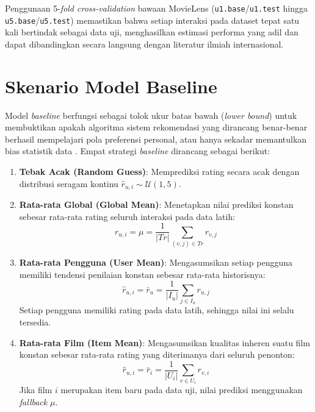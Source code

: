 Penggunaan 5-\textit{fold cross-validation} bawaan MovieLens (\texttt{u1.base}/\texttt{u1.test} hingga \texttt{u5.base}/\texttt{u5.test}) memastikan bahwa setiap interaksi pada dataset tepat satu kali bertindak sebagai data uji, menghasilkan estimasi performa yang adil dan dapat dibandingkan secara langsung dengan literatur ilmiah internasional.

\section{Skenario Model Baseline}
Model \textit{baseline} berfungsi sebagai tolok ukur batas bawah (\textit{lower bound}) untuk membuktikan apakah algoritma sistem rekomendasi yang dirancang benar-benar berhasil mempelajari pola preferensi personal, atau hanya sekadar memantulkan bias statistik data \citep{jannach2010recommender}. Empat strategi \textit{baseline} dirancang sebagai berikut:
\begin{enumerate}
    \item \textbf{Tebak Acak (Random Guess)}: Memprediksi rating secara acak dengan distribusi seragam kontinu $\hat{r}_{u,i} \sim \mathcal{U}(1, 5)$.
    \item \textbf{Rata-rata Global (Global Mean)}: Menetapkan nilai prediksi konstan sebesar rata-rata rating seluruh interaksi pada data latih:
    \begin{equation}
    \hat{r}_{u,i} = \mu = \frac{1}{|Tr|} \sum_{(v, j) \in Tr} r_{v,j}
    \end{equation}
    \item \textbf{Rata-rata Pengguna (User Mean)}: Mengasumsikan setiap pengguna memiliki tendensi penilaian konstan sebesar rata-rata historisnya:
    \begin{equation}
    \hat{r}_{u,i} = \bar{r}_u = \frac{1}{|I_u|} \sum_{j \in I_u} r_{u,j}
    \end{equation}
    Setiap pengguna memiliki rating pada data latih, sehingga nilai ini selalu tersedia.
    \item \textbf{Rata-rata Film (Item Mean)}: Mengasumsikan kualitas inheren suatu film konstan sebesar rata-rata rating yang diterimanya dari seluruh penonton:
    \begin{equation}
    \hat{r}_{u,i} = \bar{r}_i = \frac{1}{|U_i|} \sum_{v \in U_i} r_{v,i}
    \end{equation}
    Jika film $i$ merupakan item baru pada data uji, nilai prediksi menggunakan \textit{fallback} $\mu$.
\end{enumerate}

